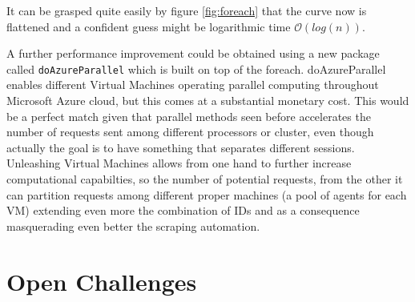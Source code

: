 \documentclass[
  12pt,
  a4paper,
  oneside]{book}
\theoremstyle{definition}
\theoremstyle{definition}
\theoremstyle{definition}
\theoremstyle{remark}
\begin{document}
It can be grasped quite easily by figure \ref{fig:foreach} that the curve now is flattened and a confident guess might be logarithmic time \(\mathcal{O}(log(n))\).

A further performance improvement could be obtained using a new package called \texttt{doAzureParallel} which is built on top of the foreach. doAzureParallel enables different Virtual Machines operating parallel computing throughout Microsoft Azure cloud, but this comes at a substantial monetary cost. This would be a perfect match given that parallel methods seen before accelerates the number of requests sent among different processors or cluster, even though actually the goal is to have something that separates different sessions. Unleashing Virtual Machines allows from one hand to further increase computational capabilties, so the number of potential requests, from the other it can partition requests among different proper machines (a pool of agents for each VM) extending even more the combination of IDs and as a consequence masquerading even better the scraping automation.

\hypertarget{challenges}{%
\section{Open Challenges}\label{challenges}}
\end{document}
